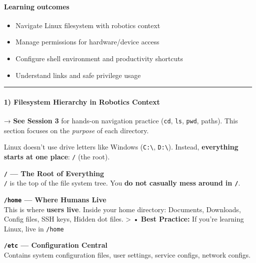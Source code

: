 \documentclass[
  english,
  paper=a4,
  oneside  ,captions=tableheading
]{scrartcl}
\providecommand{\tightlist}{%
  \setlength{\itemsep}{0pt}\setlength{\parskip}{0pt}}
\renewenvironment{quote}{\begin{customblockquote}\list{}{\rightmargin=0em\leftmargin=0em}%
\item\relax\color{blockquote-text}\ignorespaces}{\unskip\unskip\endlist\end{customblockquote}}
\begin{document}
\paragraph{Learning outcomes}\label{learning-outcomes-5}

\begin{itemize}
\tightlist
\item
  Navigate Linux filesystem with robotics context
\item
  Manage permissions for hardware/device access
\item
  Configure shell environment and productivity shortcuts
\item
  Understand links and safe privilege usage
\end{itemize}

\begin{center}\rule{0.5\linewidth}{0.5pt}\end{center}

\paragraph{1) Filesystem Hierarchy in Robotics
Context}\label{filesystem-hierarchy-in-robotics-context}

\begin{quote}
→ \textbf{See Session 3} for hands-on navigation practice (\texttt{cd},
\texttt{ls}, \texttt{pwd}, paths). This section focuses on the
\emph{purpose} of each directory.
\end{quote}

Linux doesn't use drive letters like Windows
(\texttt{C:\textbackslash{}}, \texttt{D:\textbackslash{}}). Instead,
\textbf{everything starts at one place}: \texttt{/} (the root).

\textbf{\texttt{/} --- The Root of Everything}\\
\texttt{/} is the top of the file system tree. You \textbf{do not
casually mess around in \texttt{/}}.

\textbf{\texttt{/home} --- Where Humans Live}\\
This is where \textbf{users live}. Inside your home directory:
Documents, Downloads, Config files, SSH keys, Hidden dot files.
\textgreater{} • \textbf{Best Practice:} If you're learning Linux, live
in \texttt{/home}

\textbf{\texttt{/etc} --- Configuration Central}\\
Contains system configuration files, user settings, service configs,
network configs.
\end{document}

